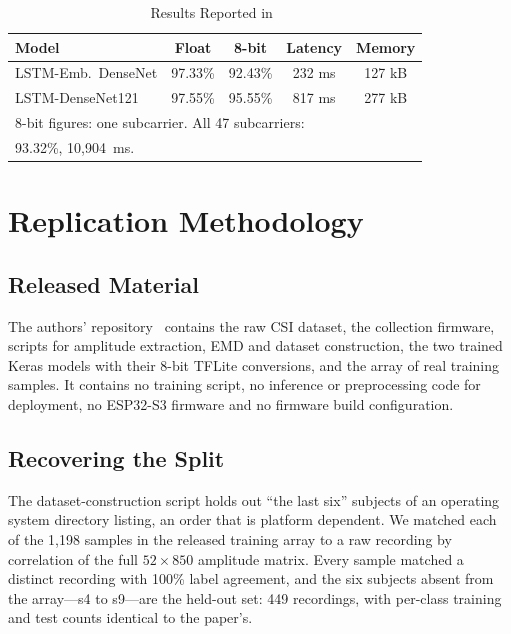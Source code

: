 \documentclass[journal]{IEEEtran}
\begin{document}
\begin{table}[!t]
\caption{Results Reported in~\cite{armenta2025tools}}
\label{tab:reported}
\centering
\setlength{\tabcolsep}{4pt}
\begin{tabular}{lcccc}
\hline
Model & Float & 8-bit & Latency & Memory\\
\hline
LSTM-Emb.\ DenseNet & 97.33\% & 92.43\% & 232 ms & 127 kB\\
LSTM-DenseNet121    & 97.55\% & 95.55\% & 817 ms & 277 kB\\
\hline
\multicolumn{5}{l}{\footnotesize 8-bit figures: one subcarrier. All 47 subcarriers:}\\
\multicolumn{5}{l}{\footnotesize 93.32\%, 10{,}904~ms.}
\end{tabular}
\end{table}

\section{Replication Methodology}
\label{sec:method}

\subsection{Released Material}
The authors' repository~\cite{armenta2025repo} contains the raw CSI dataset, the
collection firmware, scripts for amplitude extraction, EMD and dataset construction,
the two trained Keras models with their 8-bit TFLite conversions, and the array of
real training samples. It contains no training script, no inference or
preprocessing code for deployment, no ESP32-S3 firmware and no firmware build
configuration.

\subsection{Recovering the Split}
The dataset-construction script holds out ``the last six'' subjects of an operating
system directory listing, an order that is platform dependent. We matched each of the
1{,}198 samples in the released training array to a raw recording by correlation
of the full $52 \times 850$ amplitude matrix. Every sample matched a distinct
recording with 100\% label agreement, and the six subjects absent from the array---s4
to s9---are the held-out set: 449 recordings, with per-class training and test counts
identical to the paper's.
\end{document}
